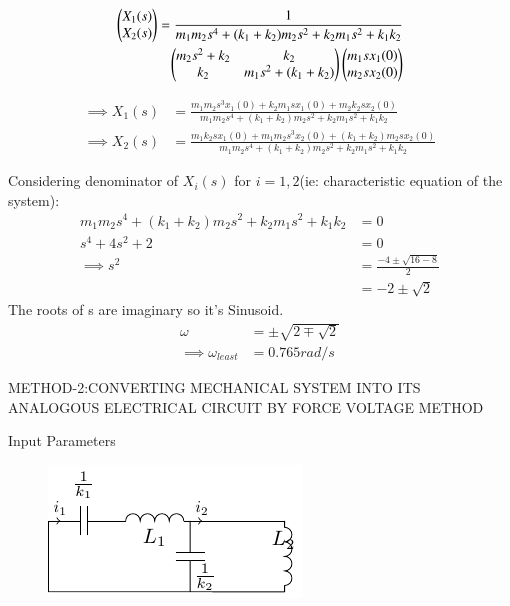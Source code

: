 \documentclass[journal,12pt,twocolumn]{IEEEtran}
\theoremstyle{remark}
\begin{document}
\begin{align}
\begin{pmatrix}
X_1(s) \\
X_2(s)
\end{pmatrix}
= \frac{1}{m_1m_2s^4+(k_1+k_2)m_2s^2+k_2m_1s^2+k_1k_2} \nonumber \\
\begin{pmatrix}
m_2s^2+k_2 & k_2  \\
k_2& m_1s^2+(k_1+k_2)
\end{pmatrix}
\begin{pmatrix}
m_1sx_1(0) \\
m_2sx_2(0)
\end{pmatrix}
\end{align}

\begin{align}
\implies X_1(s)&=\frac{m_1m_2s^3x_1(0)+k_2m_1sx_1(0)+m_2k_2sx_2(0)}{m_1m_2s^4+(k_1+k_2)m_2s^2+k_2m_1s^2+k_1k_2} \\
\implies X_2(s)&=\frac{m_1k_2sx_1(0)+m_1m_2s^3x_2(0)+(k_1+k_2)m_2sx_2(0)}{m_1m_2s^4+(k_1+k_2)m_2s^2+k_2m_1s^2+k_1k_2}
\end{align}

Considering denominator of $X_i(s)$ for $i=1,2$(ie: characteristic equation of the system):
\begin{align}
m_1m_2s^4+(k_1+k_2)m_2s^2+k_2m_1s^2+k_1k_2 &=0 \\
s^4 +4s^2+2&=0\\
\implies s^2&=\frac{-4\pm \sqrt{16-8}}{2} \\
&= -2 \pm \sqrt{2} 
\end{align}
The roots of s are imaginary so it's Sinusoid.
\begin{align}
\omega&=\pm\sqrt{2\mp \sqrt{2}}\\
\implies \omega_{least} &= 0.765 rad/s
\end{align} 


METHOD-2:CONVERTING MECHANICAL SYSTEM INTO ITS ANALOGOUS ELECTRICAL CIRCUIT BY FORCE VOLTAGE METHOD


\begin{table}[!ht]    
    \centering
    \resizebox{9cm}{2cm}{
         
    }
    \caption{Input Parameters}
    \label{table:ishitha.g22.nm.54.t2}
\end{table}

\begin{figure}[!ht]
    \centering
    \includegraphics[width=\columnwidth]{figs/tikz.pdf}
    \caption{ }
    \label{fig:ishitha.g22.nm.54.f3}
\end{figure}  
 
\end{document}
